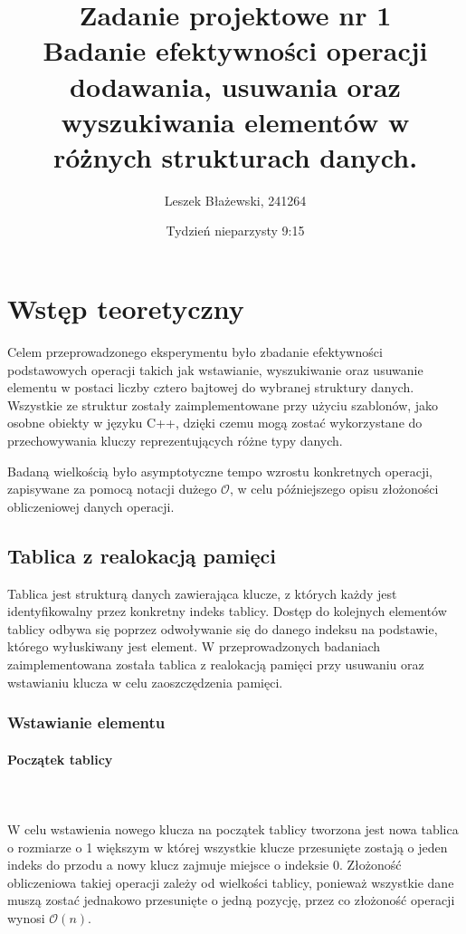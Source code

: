 \documentclass{article}
\title{Zadanie projektowe nr 1 \\ Badanie efektywności operacji dodawania, usuwania oraz wyszukiwania elementów w różnych strukturach danych.}
\author{Leszek Błażewski, 241264}
\date{Tydzień nieparzysty 9:15}
\newcommand{\myparagraph}[1]{\paragraph{#1}\mbox{}\\\\}
\begin{document}
\maketitle
\thispagestyle{empty}

\newpage{}
\setcounter{page}{1}


\tableofcontents

\newpage{}

\section{Wstęp teoretyczny}

Celem przeprowadzonego eksperymentu było zbadanie efektywności podstawowych operacji takich jak wstawianie, wyszukiwanie oraz usuwanie elementu w postaci liczby cztero bajtowej do wybranej struktury danych.\linebreak
Wszystkie ze struktur zostały zaimplementowane przy użyciu szablonów, jako osobne obiekty w języku C++, dzięki czemu mogą zostać wykorzystane do przechowywania kluczy reprezentujących różne typy danych.

Badaną wielkością było asymptotyczne tempo wzrostu konkretnych operacji, zapisywane za pomocą notacji dużego $\mathcal{O}$, w celu późniejszego opisu złożoności obliczeniowej danych operacji.


\subsection{Tablica z realokacją pamięci}

Tablica jest strukturą danych zawierająca klucze, z których każdy jest \linebreak identyfikowalny przez konkretny indeks tablicy. Dostęp do kolejnych elementów tablicy odbywa się poprzez odwoływanie się do danego indeksu na podstawie, którego wyłuskiwany jest element.
W przeprowadzonych badaniach \linebreak zaimplementowana została tablica z realokacją pamięci przy usuwaniu oraz wstawianiu klucza w celu zaoszczędzenia pamięci.

\subsubsection{Wstawianie elementu} 

\myparagraph{Początek tablicy}
W celu wstawienia nowego klucza na początek tablicy tworzona jest nowa tablica o rozmiarze o 1 większym w której wszystkie klucze przesunięte zostają o jeden indeks do przodu a nowy klucz zajmuje miejsce o indeksie 0. Złożoność obliczeniowa takiej operacji zależy od wielkości tablicy, ponieważ wszystkie dane muszą zostać jednakowo przesunięte o jedną pozycję, przez co złożoność operacji wynosi $\mathcal{O}(n)$.
 
\end{document}
